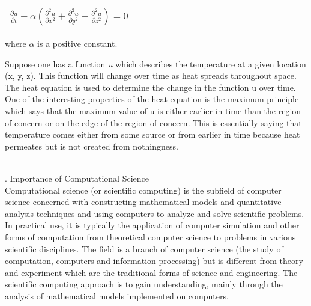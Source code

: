 \documentclass{article}
\begin{document}
\begin{center}
\begin{tabular}{|c|}
\hline
$ \frac{\partial u} {\partial t} - \alpha (\frac{\partial^2 u}{\partial x^2} +\frac{\partial^2 u}{\partial y^2} + \frac{\partial^2 u}{\partial z^2}) = 0 $
\\
\hline
\end{tabular}
where $\alpha$ is a positive constant.
\end{center}
Suppose one has a function \emph{u} which describes the temperature at a given location (x, y, z). This function will change over time as heat spreads throughout space. The heat equation is used to determine the change in the function u over time. One of the interesting properties of the heat equation is the maximum principle which says that the maximum value of u is either earlier in time than the region of concern or on the edge of the region of concern. This is essentially saying that temperature comes either from some source or from earlier in time because heat permeates but is not created from nothingness.
\\
\\
. Importance of Computational Science
\\

Computational science (or scientific computing) is the subfield of computer science concerned with constructing mathematical models and quantitative analysis techniques and using computers to analyze and solve scientific problems. In practical use, it is typically the application of computer simulation and other forms of computation from theoretical computer science to problems in various scientific disciplines. The field is a branch of computer science (the study of computation, computers and information processing) but is different from theory and experiment which are the traditional forms of science and engineering. The scientific computing approach is to gain understanding, mainly through the analysis of mathematical models implemented on computers.
\end{document}
